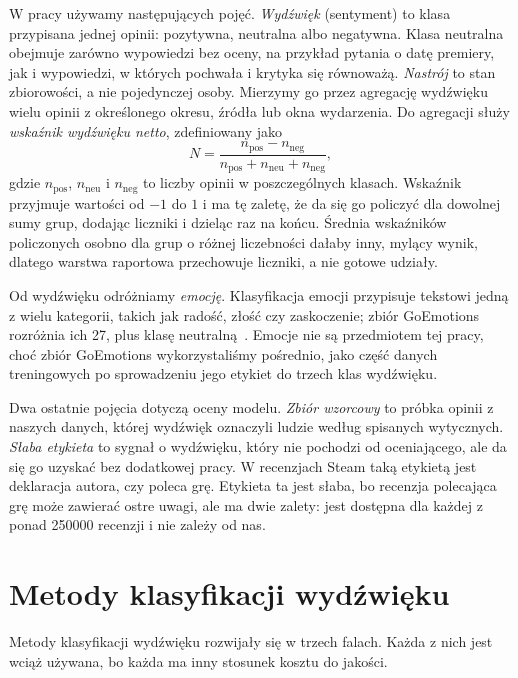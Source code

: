 W pracy używamy następujących pojęć.
\emph{Wydźwięk} (sentyment) to klasa przypisana jednej opinii: pozytywna, neutralna albo negatywna.
Klasa neutralna obejmuje zarówno wypowiedzi bez oceny, na przykład pytania o datę premiery, jak i wypowiedzi, w których pochwała i krytyka się równoważą.
\emph{Nastrój} to stan zbiorowości, a nie pojedynczej osoby.
Mierzymy go przez agregację wydźwięku wielu opinii z określonego okresu, źródła lub okna wydarzenia.
Do agregacji służy \emph{wskaźnik wydźwięku netto}, zdefiniowany jako
\begin{equation}
  N = \frac{n_{\mathrm{pos}} - n_{\mathrm{neg}}}{n_{\mathrm{pos}} + n_{\mathrm{neu}} + n_{\mathrm{neg}}},
  \label{eq:net-sentiment}
\end{equation}
gdzie $n_{\mathrm{pos}}$, $n_{\mathrm{neu}}$ i $n_{\mathrm{neg}}$ to liczby opinii w poszczególnych klasach.
Wskaźnik przyjmuje wartości od $-1$ do $1$ i ma tę zaletę, że da się go policzyć dla dowolnej sumy grup, dodając liczniki i dzieląc raz na końcu.
Średnia wskaźników policzonych osobno dla grup o różnej liczebności dałaby inny, mylący wynik, dlatego warstwa raportowa przechowuje liczniki, a nie gotowe udziały.

Od wydźwięku odróżniamy \emph{emocję}.
Klasyfikacja emocji przypisuje tekstowi jedną z wielu kategorii, takich jak radość, złość czy zaskoczenie; zbiór GoEmotions rozróżnia ich 27, plus klasę neutralną~\cite{demszky2020goemotions}.
Emocje nie są przedmiotem tej pracy, choć zbiór GoEmotions wykorzystaliśmy pośrednio, jako część danych treningowych po sprowadzeniu jego etykiet do trzech klas wydźwięku.

Dwa ostatnie pojęcia dotyczą oceny modelu.
\emph{Zbiór wzorcowy} to próbka opinii z naszych danych, której wydźwięk oznaczyli ludzie według spisanych wytycznych.
\emph{Słaba etykieta} to sygnał o wydźwięku, który nie pochodzi od oceniającego, ale da się go uzyskać bez dodatkowej pracy.
W recenzjach Steam taką etykietą jest deklaracja autora, czy poleca grę.
Etykieta ta jest słaba, bo recenzja polecająca grę może zawierać ostre uwagi, ale ma dwie zalety: jest dostępna dla każdej z ponad \num{250000} recenzji i nie zależy od nas.

\section{Metody klasyfikacji wydźwięku}
\label{sec:sentiment-methods}

Metody klasyfikacji wydźwięku rozwijały się w trzech falach.
Każda z nich jest wciąż używana, bo każda ma inny stosunek kosztu do jakości.

